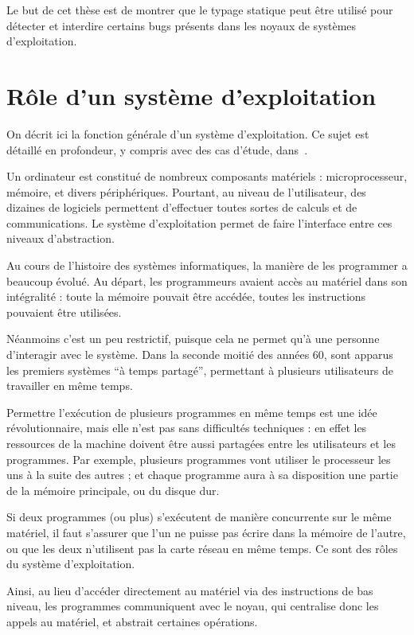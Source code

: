 Le but de cet thèse est de montrer que le typage statique peut être utilisé pour
détecter et interdire certains bugs présents dans les noyaux de systèmes
d'exploitation.

\section{Rôle d'un système d'exploitation}

On décrit ici la fonction générale d'un système d'exploitation. Ce sujet est
détaillé en profondeur, y compris avec des cas d'étude, dans~\cite{tanenbaum}.

Un ordinateur est constitué de nombreux composants matériels : microprocesseur,
mémoire, et divers périphériques. Pourtant, au niveau de l'utilisateur, des
dizaines de logiciels permettent d'effectuer toutes sortes de calculs et de
communications. Le système d'exploitation permet de faire l'interface entre ces
niveaux d'abstraction.

Au cours de l'histoire des systèmes informatiques, la manière de les programmer
a beaucoup évolué. Au départ, les programmeurs avaient accès au matériel dans
son intégralité : toute la mémoire pouvait être accédée, toutes les instructions
pouvaient être utilisées.

Néanmoins c'est un peu restrictif, puisque cela ne permet qu'à une personne
d'interagir avec le système. Dans la seconde moitié des années 60, sont apparus
les premiers systèmes ``à temps partagé'', permettant à plusieurs utilisateurs
de travailler en même temps.

Permettre l'exécution de plusieurs programmes en même temps est une idée
révolutionnaire, mais elle n'est pas sans difficultés techniques : en effet les
ressources de la machine doivent être aussi partagées entre les utilisateurs et
les programmes. Par exemple, plusieurs programmes vont utiliser le processeur
les uns à la suite des autres ; et chaque programme aura à sa disposition une
partie de la mémoire principale, ou du disque dur.

Si deux programmes (ou plus) s'exécutent de manière concurrente sur le même
matériel, il faut s'assurer que l'un ne puisse pas écrire dans la mémoire de
l'autre, ou que les deux n'utilisent pas la carte réseau en même temps. Ce sont
des rôles du système d'exploitation.

Ainsi, au lieu d'accéder directement au matériel via des instructions de bas
niveau, les programmes communiquent avec le noyau, qui centralise donc les
appels au matériel, et abstrait certaines opérations.

